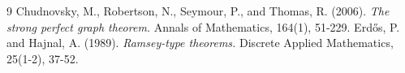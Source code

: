 \documentclass[11pt, a4paper]{article}
\begin{document}
\vspace{2cm}
\begin{thebibliography}{9}
Chudnovsky, M., Robertson, N., Seymour, P., and Thomas, R. (2006). \textit{The strong perfect graph theorem.} Annals of Mathematics, 164(1), 51-229.
Erdős, P. and Hajnal, A. (1989). \textit{Ramsey-type theorems.} Discrete Applied Mathematics, 25(1-2), 37-52.
\end{thebibliography}
\end{document}
